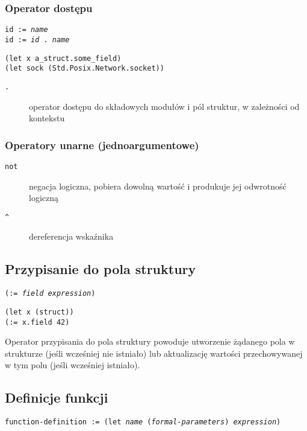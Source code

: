 \subsubsection{Operator dostępu}

\texttt{id := \emph{name}} \\
\texttt{id := \emph{id} . \emph{name}}

\begin{lstlisting}
(let x a_struct.some_field)
(let sock (Std.Posix.Network.socket))
\end{lstlisting}

\begin{description}
    \item[\texttt{.}] operator dostępu do składowych modułów i pól struktur, w zależności od kontekstu
\end{description}

\subsubsection{Operatory unarne (jednoargumentowe)}

\begin{description}
    \item[\texttt{not}] negacja logiczna, pobiera dowolną wartość i produkuje jej odwrotność logiczną
    \item[\texttt{\^}] dereferencja wskaźnika
\end{description}

\subsection{Przypisanie do pola struktury}

\texttt{(:= \emph{field} \emph{expression})}

\begin{lstlisting}
(let x (struct))
(:= x.field 42)
\end{lstlisting}

Operator przypisania do pola struktury powoduje utworzenie żądanego pola w strukturze (jeśli wcześniej nie
istniało) lub aktualizację wartości przechowywanej w tym polu (jeśli wcześniej istniało).

\subsection{Definicje funkcji}

\texttt{function-definition := (let \emph{name} (\emph{formal-parameters}) \emph{expression})}

